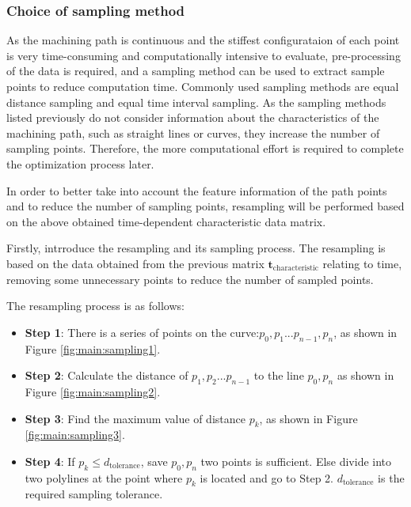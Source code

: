 \subsubsection{Choice of sampling method}\label{subsubsec:subsec:sec:scheme:process:Data Pre-processing:sampling method}
As the machining path is continuous and the stiffest configurataion of each point is very time-consuming and computationally intensive to evaluate, pre-processing of the data is required, and a sampling method can be used to extract sample points to reduce computation time. Commonly used sampling methods are equal distance sampling and equal time interval sampling. As the sampling methods listed previously do not consider information about the characteristics of the machining path, such as straight lines or curves, they increase the number of sampling points. Therefore, the more computational effort is required to complete the optimization process later. \par
In order to better take into account the feature information of the path points and to reduce the number of sampling points, resampling will be performed based on the above obtained time-dependent characteristic data matrix. \par
Firstly, intrroduce the resampling and its sampling process. The resampling is based on the data obtained from the previous matrix $\boldsymbol{t_{\mathrm{characteristic}}}$ relating to time, removing some unnecessary points to reduce the number of sampled points. \par
The resampling process is as follows:
\begin{itemize}
 \item \textbf{Step 1}: There is a series of points on the curve:$p_{0},p_{1}...p_{n-1},p_{n}$, as shown in
Figure \ref{fig:main:sampling1}.
\item \textbf{Step 2}: Calculate the distance of $p_{1},p_{2}...p_{n-1}$ to the line $p_{0},p_{n}$ as shown in
Figure \ref{fig:main:sampling2}.
\item \textbf{Step 3}: Find the maximum value of distance $p_{k}$, as shown in
Figure \ref{fig:main:sampling3}.
\item \textbf{Step 4}: If $p_{k}\leq d_\mathrm{tolerance}$, save $p_{0},p_{n}$ two points is sufficient. Else divide into two polylines at the point where $p_{k}$ is located and go to Step 2. $d_\mathrm{tolerance}$ is the required sampling tolerance.
\end{itemize}
